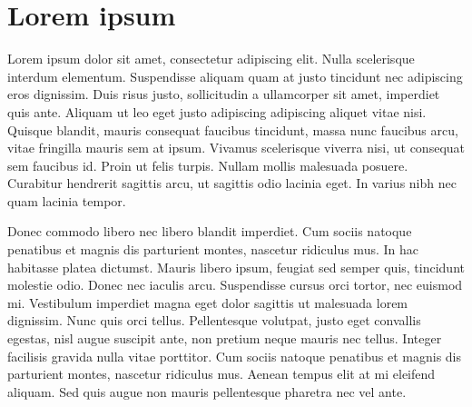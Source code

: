 
\chapter{Lorem ipsum}
\label{cha:lorem-ipsum}

Lorem ipsum dolor sit amet, consectetur adipiscing elit. Nulla
scelerisque interdum elementum. Suspendisse aliquam quam at justo
tincidunt nec adipiscing eros dignissim. Duis risus justo,
sollicitudin a ullamcorper sit amet, imperdiet quis ante. Aliquam ut
leo eget justo adipiscing adipiscing aliquet vitae nisi. Quisque
blandit, mauris consequat faucibus tincidunt, massa nunc faucibus
arcu, vitae fringilla mauris sem at ipsum. Vivamus scelerisque viverra
nisi, ut consequat sem faucibus id. Proin ut felis turpis. Nullam
mollis malesuada posuere. Curabitur hendrerit sagittis arcu, ut
sagittis odio lacinia eget. In varius nibh nec quam lacinia tempor.

Donec commodo libero nec libero blandit imperdiet. Cum sociis natoque
penatibus et magnis dis parturient montes, nascetur ridiculus mus. In
hac habitasse platea dictumst. Mauris libero ipsum, feugiat sed semper
quis, tincidunt molestie odio. Donec nec iaculis arcu. Suspendisse
cursus orci tortor, nec euismod mi. Vestibulum imperdiet magna eget
dolor sagittis ut malesuada lorem dignissim. Nunc quis orci
tellus. Pellentesque volutpat, justo eget convallis egestas, nisl
augue suscipit ante, non pretium neque mauris nec tellus. Integer
facilisis gravida nulla vitae porttitor. Cum sociis natoque penatibus
et magnis dis parturient montes, nascetur ridiculus mus. Aenean tempus
elit at mi eleifend aliquam. Sed quis augue non mauris pellentesque
pharetra nec vel ante.

